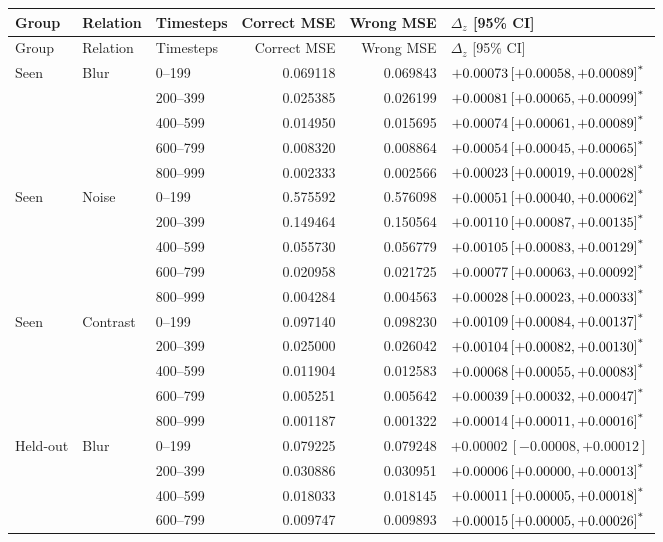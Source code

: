 \documentclass[10pt]{article}
\newcommand{\sig}{\textsuperscript{*}}
\begin{document}
\scriptsize
\begin{longtable}{lllrrl}
\toprule
Group & Relation & Timesteps & Correct MSE & Wrong MSE & $\Delta_z$ [95\% CI]\\
\midrule
\endfirsthead
\toprule
Group & Relation & Timesteps & Correct MSE & Wrong MSE & $\Delta_z$ [95\% CI]\\
\midrule
\endhead
Seen & Blur & 0--199 & 0.069118 & 0.069843 & $+0.00073\,[+0.00058,+0.00089]\sig$\\
 & & 200--399 & 0.025385 & 0.026199 & $+0.00081\,[+0.00065,+0.00099]\sig$\\
 & & 400--599 & 0.014950 & 0.015695 & $+0.00074\,[+0.00061,+0.00089]\sig$\\
 & & 600--799 & 0.008320 & 0.008864 & $+0.00054\,[+0.00045,+0.00065]\sig$\\
 & & 800--999 & 0.002333 & 0.002566 & $+0.00023\,[+0.00019,+0.00028]\sig$\\
\midrule
Seen & Noise & 0--199 & 0.575592 & 0.576098 & $+0.00051\,[+0.00040,+0.00062]\sig$\\
 & & 200--399 & 0.149464 & 0.150564 & $+0.00110\,[+0.00087,+0.00135]\sig$\\
 & & 400--599 & 0.055730 & 0.056779 & $+0.00105\,[+0.00083,+0.00129]\sig$\\
 & & 600--799 & 0.020958 & 0.021725 & $+0.00077\,[+0.00063,+0.00092]\sig$\\
 & & 800--999 & 0.004284 & 0.004563 & $+0.00028\,[+0.00023,+0.00033]\sig$\\
\midrule
Seen & Contrast & 0--199 & 0.097140 & 0.098230 & $+0.00109\,[+0.00084,+0.00137]\sig$\\
 & & 200--399 & 0.025000 & 0.026042 & $+0.00104\,[+0.00082,+0.00130]\sig$\\
 & & 400--599 & 0.011904 & 0.012583 & $+0.00068\,[+0.00055,+0.00083]\sig$\\
 & & 600--799 & 0.005251 & 0.005642 & $+0.00039\,[+0.00032,+0.00047]\sig$\\
 & & 800--999 & 0.001187 & 0.001322 & $+0.00014\,[+0.00011,+0.00016]\sig$\\
\midrule
Held-out & Blur & 0--199 & 0.079225 & 0.079248 & $+0.00002\,[-0.00008,+0.00012]$\\
 & & 200--399 & 0.030886 & 0.030951 & $+0.00006\,[+0.00000,+0.00013]\sig$\\
 & & 400--599 & 0.018033 & 0.018145 & $+0.00011\,[+0.00005,+0.00018]\sig$\\
 & & 600--799 & 0.009747 & 0.009893 & $+0.00015\,[+0.00005,+0.00026]\sig$\\

\end{longtable}
\end{document}
